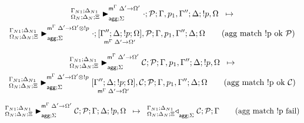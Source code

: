 
\begin{multline}
\transx{
   \matstatea{\Delta_N}{\cdot;
      \lstack{P}}{\Gamma, p_1, \Gamma''}{\Delta}{\bang p, \Omega}{\Delta' \rightarrow
         \Omega'}{\Sigma}
}
{
   \matstatea{\Delta_N}{\cdot; \pframe{\Gamma''}{\Delta}{\bang
   p}{\Omega}{\Delta'}{\Omega'}, \lstack{P}}{\Gamma, p_1, \Gamma''}{\Delta}{\Omega}
   {\Delta' \rightarrow \Omega' \otimes \bang p}{\Sigma}
} \tag{agg match \bang p ok $\lstack{P}$}
\end{multline}

\begin{multline}
\transx{
   \matstatea{\Delta_N}{\lstack{C};
      \lstack{P}}{\Gamma, p_1, \Gamma''}{\Delta}{\bang p, \Omega}{\Delta' \rightarrow
         \Omega'}{\Sigma}
}
{
   \matstatea{\Delta_N}{\pframe{\Gamma''}{\Delta}{\bang
   p}{\Omega}{\Delta'}{\Omega'}, \lstack{C} ; \lstack{P}}{\Gamma, p_1, \Gamma''}{\Delta}{\Omega}
   {\Delta' \rightarrow \Omega' \otimes \bang p}{\Sigma}
} \tag{agg match \bang p ok $\lstack{C}$}
\end{multline}

\[
\trans{
   \matstatea{\Delta_N}{\lstack{C}; \lstack{P}}{\Gamma}{\Delta}{\bang p,
      \Omega}{\Delta' \rightarrow \Omega'}{\Sigma}
}
{
   \contstatea{\Delta_N}{\lstack{C} ; \lstack{P}}{\Gamma}{\Sigma}
} \tag{agg match \bang p fail}
\]


